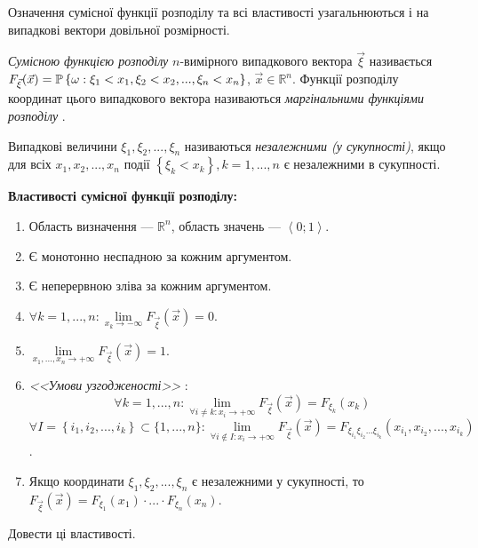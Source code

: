 Означення сумісної функції розподілу та всі властивості узагальнюються і на випадкові вектори довільної розмірності.
\begin{definition} 
    \emph{Сумісною функцією розподілу} $n$-вимірного випадкового вектора $\vec{\xi}$ 
    називається $F_{\vec{\xi}}(\vec{x}) = \P\left\{\omega: \xi_1 < x_1, \xi_2 < x_2, ..., \xi_n < x_n\right\}$, $\vec{x} \in \mathbb{R}^n$.
    Функції розподілу координат цього випадкового вектора називаються \emph{маргінальними функціями розподілу} .
\end{definition}
\begin{definition}
    Випадкові величини $\xi_1, \xi_2, ..., \xi_n$ називаються
    \emph{незалежними (у сукупності)}, якщо для всіх
    $x_1, x_2, ... , x_n$
    події $\left\{\xi_k < x_k\right\}, k=1,...,n$ є незалежними в сукупності.
\end{definition}

\noindent\textbf{Властивості сумісної функції розподілу:}
\begin{enumerate}
    \item Область визначення --- $\mathbb{R}^n$, область значень --- $\left<0; 1\right>$.
    \item Є монотонно неспадною за кожним аргументом.
    \item Є неперервною зліва за кожним аргументом.
    \item $\forall k = 1,...,n: \underset{x_k \to -\infty}{\lim} F_{\vec{\xi}}(\vec{x}) = 0$.
    \item $\lim\limits_{x_1, ..., x_n \rightarrow +\infty} F_{\vec{\xi}}(\vec{x}) = 1$.
    \item \emph{<<Умови узгодженості>>} : 
        $$\forall k = 1,...,n: \lim\limits_{\forall i\neq k : x_i \to + \infty} F_{\vec{\xi}}(\vec{x}) = F_{\xi_k}(x_k)$$
        $$\forall I = \left\{i_1, i_2, ..., i_k\right\} \subset \{1,...,n\}: 
        \lim\limits_{\forall i \notin I : x_i \to + \infty} F_{\vec{\xi}}(\vec{x}) =
        F_{\xi_{i_1} \xi_{i_2} ... \xi_{i_k}}(x_{i_1}, x_{i_2}, ..., x_{i_k})$$.
    \item Якщо координати $\xi_1, \xi_2, ..., \xi_n$ є незалежними у сукупності, то 
    $F_{\vec{\xi}}(\vec{x}) = F_{\xi_1}(x_1) \cdot ... \cdot F_{\xi_n}(x_n)$.
\end{enumerate}
\begin{exercise}
    Довести ці властивості.
\end{exercise}

